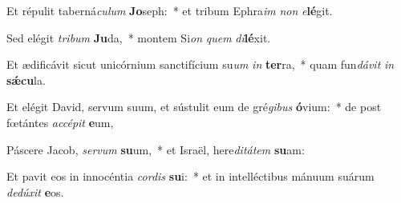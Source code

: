 \item Et répulit taberná\textit{cu}\textit{lum} \textbf{Jo}seph:~* et tribum Ephra\textit{im} \textit{non} \textit{e}\textbf{lé}git.
\item Sed elégit \textit{tri}\textit{bum} \textbf{Ju}da,~* montem Si\textit{on} \textit{quem} \textit{di}\textbf{lé}xit.
\item Et ædificávit sicut unicórnium sanctifícium su\textit{um} \textit{in} \textbf{ter}ra,~* quam fun\textit{dá}\textit{vit} \textit{in} \textbf{sǽ}\textbf{cu}la.
\item Et elégit David, servum suum, et sústulit eum de gré\textit{gi}\textit{bus} \textbf{ó}vium:~* de post fœtántes \textit{ac}\textit{cé}\textit{pit} \textbf{e}um,
\item Páscere Jacob, \textit{ser}\textit{vum} \textbf{su}um,~* et Israël, here\textit{di}\textit{tá}\textit{tem} \textbf{su}am:
\item Et pavit eos in innocéntia \textit{cor}\textit{dis} \textbf{su}i:~* et in intelléctibus mánuum suárum \textit{de}\textit{dú}\textit{xit} \textbf{e}os.
